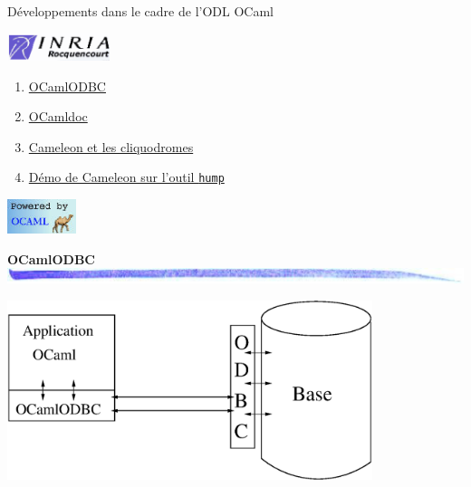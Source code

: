 \documentclass[landscape]{seminar}
\def\title#1#2{\noindent
{\bf\large #1}\\
\includegraphics[width=\textwidth]{bar.jpg.eps}
\vspace{#2cm}
}
\def\target#1{\hypertarget{#1}{}}
\begin{document}
\pagestyle{fancy}


\begin{slide}
\begin{center}
\vspace{0.5cm}

{\large{D\'eveloppements dans le cadre de l'ODL OCaml}}
\vspace{0.3cm}

\includegraphics[width=3cm]{logo.gif.eps}
\vspace{0.9cm}
\end{center}

\begin{enumerate}
\item \hyperlink{ocamlodbc}{OCamlODBC}
\item \hyperlink{ocamldoc}{OCamldoc}
\item \hyperlink{cameleon}{Cameleon et les cliquodromes}
\item \hyperlink{hump}{D\'emo de Cameleon sur l'outil {\tt hump}}
\end{enumerate}

\vspace{0.8cm}

\begin{flushright}
\includegraphics[width=2cm]{ocaml.eps}
\end{flushright}
\end{slide}


\begin{slide}
\target{ocamlodbc}
\title{OCamlODBC}{0.5}

\begin{center}
\includegraphics[width=0.8\textwidth]{ODBC.eps}
\end{center}
\end{slide}
\end{document}
